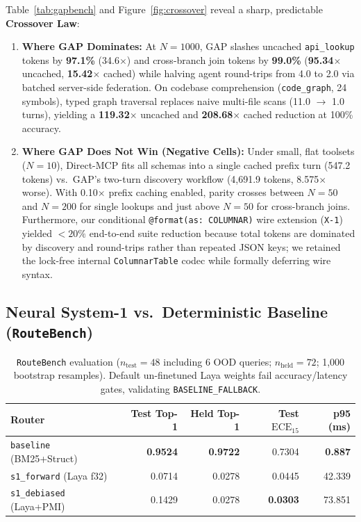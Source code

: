 \documentclass[10pt,twocolumn]{article}
\begin{document}
Table~\ref{tab:gapbench} and Figure~\ref{fig:crossover} reveal a sharp, predictable \textbf{Crossover Law}:
\begin{enumerate}
  \item \textbf{Where GAP Dominates:} At $N=1000$, GAP slashes uncached \texttt{api\_lookup} tokens by \textbf{97.1\%} (34.6$\times$) and cross-branch join tokens by \textbf{99.0\%} (\textbf{95.34$\times$} uncached, \textbf{15.42$\times$} cached) while halving agent round-trips from 4.0 to 2.0 via batched server-side federation. On codebase comprehension (\texttt{code\_graph}, 24 symbols), typed graph traversal replaces naive multi-file scans (11.0 $\rightarrow$ 1.0 turns), yielding a \textbf{119.32$\times$} uncached and \textbf{208.68$\times$} cached reduction at 100\% accuracy.
  \item \textbf{Where GAP Does Not Win (Negative Cells):} Under small, flat toolsets ($N=10$), Direct-MCP fits all schemas into a single cached prefix turn (547.2 tokens) vs.\ GAP's two-turn discovery workflow (4,691.9 tokens, 8.575$\times$ worse). With 0.10$\times$ prefix caching enabled, parity crosses between $N=50$ and $N=200$ for single lookups and just above $N=50$ for cross-branch joins. Furthermore, our conditional \texttt{@format(as: COLUMNAR)} wire extension (\texttt{X-1}) yielded $<20\%$ end-to-end suite reduction because total tokens are dominated by discovery and round-trips rather than repeated JSON keys; we retained the lock-free internal \texttt{ColumnarTable} codec while formally deferring wire syntax.
\end{enumerate}

\subsection{Neural System-1 vs.\ Deterministic Baseline (\texttt{RouteBench})}

\begin{table}[t]
\centering
\caption{\texttt{RouteBench} evaluation ($n_{\text{test}}=48$ including 6 OOD queries; $n_{\text{held}}=72$; 1,000 bootstrap resamples). Default un-finetuned Laya weights fail accuracy/latency gates, validating \texttt{BASELINE\_FALLBACK}.}
\label{tab:routebench}
\scriptsize
\begin{tabular}{@{}lrrrr@{}}
\toprule
Router & Test Top-1 & Held Top-1 & Test $\text{ECE}_{15}$ & p95 (ms) \\
\midrule
\texttt{baseline} (BM25+Struct) & \textbf{0.9524} & \textbf{0.9722} & 0.7304 & \textbf{0.887} \\
\texttt{s1\_forward} (Laya f32)   & 0.0714 & 0.0278 & 0.0445 & 42.339 \\
\texttt{s1\_debiased} (Laya+PMI)& 0.1429 & 0.0278 & \textbf{0.0303} & 73.851 \\
\bottomrule
\end{tabular}
\end{table}
\end{document}
